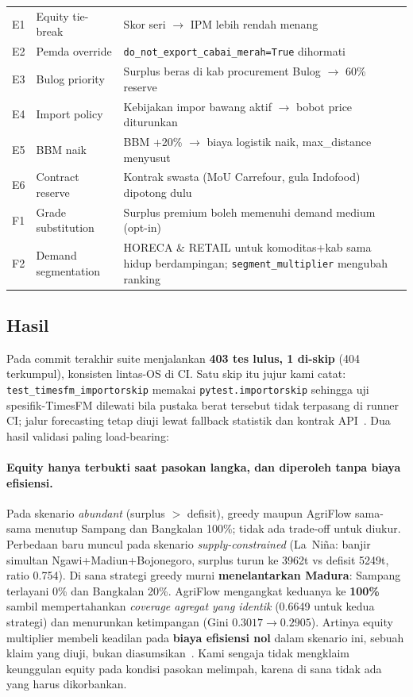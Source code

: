 \documentclass[11pt,a4paper]{article}
\newcommand{\code}[1]{\texttt{#1}}
\begin{document}
\begin{center}
\begin{longtable}{p{0.9cm}p{4.4cm}p{8.0cm}}
E1 & Equity tie-break & Skor seri $\rightarrow$ IPM lebih rendah menang~\cite{firouz2021} \\
E2 & Pemda override & \code{do\_not\_export\_cabai\_merah=True} dihormati \\
E3 & Bulog priority & Surplus beras di kab procurement Bulog $\rightarrow$ 60\% reserve \\
E4 & Import policy & Kebijakan impor bawang aktif $\rightarrow$ bobot price diturunkan \\
E5 & BBM naik & BBM +20\% $\rightarrow$ biaya logistik naik, max\_distance menyusut \\
E6 & Contract reserve & Kontrak swasta (MoU Carrefour, gula Indofood) dipotong dulu \\
F1 & Grade substitution & Surplus premium boleh memenuhi demand medium (opt-in) \\
F2 & Demand segmentation & HORECA \& RETAIL untuk komoditas+kab sama hidup berdampingan; \code{segment\_multiplier} mengubah ranking \\
\bottomrule
\end{longtable}
\end{center}

\subsection{Hasil}
Pada commit terakhir suite menjalankan \textbf{403 tes lulus, 1 di-skip}
(404 terkumpul), konsisten lintas-OS di CI. Satu skip itu jujur kami catat:
\code{test\_timesfm\_importorskip} memakai \code{pytest.importorskip} sehingga
uji spesifik-TimesFM dilewati bila pustaka berat tersebut tidak terpasang di
runner CI; jalur forecasting tetap diuji lewat fallback statistik dan kontrak
API~\cite{timesfm2023}. Dua hasil validasi paling load-bearing:

\paragraph{Equity hanya terbukti saat pasokan langka, dan diperoleh tanpa
biaya efisiensi.} Pada skenario \emph{abundant} (surplus $>$ defisit), greedy
maupun AgriFlow sama-sama menutup Sampang dan Bangkalan 100\%; tidak ada
trade-off untuk diukur. Perbedaan baru muncul pada skenario \emph{supply-constrained}
(La~Ni\~na: banjir simultan Ngawi+Madiun+Bojonegoro, surplus turun ke 3962t vs
defisit 5249t, ratio 0.754). Di sana strategi greedy murni \textbf{menelantarkan
Madura}: Sampang terlayani 0\% dan Bangkalan 20\%. AgriFlow mengangkat keduanya ke
\textbf{100\%} sambil mempertahankan \emph{coverage agregat yang identik}
(0.6649 untuk kedua strategi) dan menurunkan ketimpangan (Gini $0.3017
\rightarrow 0.2905$). Artinya equity multiplier membeli keadilan pada
\textbf{biaya efisiensi nol} dalam skenario ini, sebuah klaim yang diuji,
bukan diasumsikan~\cite{firouz2021,alem2021,hakimifar2022}. Kami sengaja tidak
mengklaim keunggulan equity pada kondisi pasokan melimpah, karena di sana
tidak ada yang harus dikorbankan.
\end{document}
